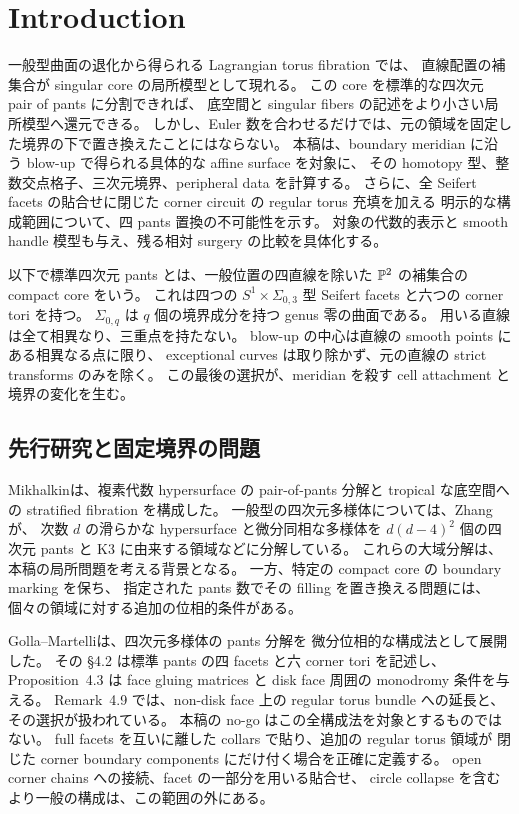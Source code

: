 \section{Introduction}
\label{cs8:introduction}

一般型曲面の退化から得られる Lagrangian torus fibration では、
直線配置の補集合が singular core の局所模型として現れる。
この core を標準的な四次元 pair of pants に分割できれば、
底空間と singular fibers の記述をより小さい局所模型へ還元できる。
しかし、Euler 数を合わせるだけでは、元の領域を固定した境界の下で置き換えたことにはならない。
本稿は、boundary meridian に沿う blow-up で得られる具体的な affine surface を対象に、
その homotopy 型、整数交点格子、三次元境界、peripheral data を計算する。
さらに、全 Seifert facets の貼合せに閉じた corner circuit の regular torus 充填を加える
明示的な構成範囲について、四 pants 置換の不可能性を示す。
対象の代数的表示と smooth handle 模型も与え、残る相対 surgery の比較を具体化する。

以下で標準四次元 pants とは、一般位置の四直線を除いた
$\mathbb P^2$ の補集合の compact core をいう。
これは四つの $S^1\times\Sigma_{0,3}$ 型 Seifert facets と六つの corner tori を持つ。
$\Sigma_{0,q}$ は $q$ 個の境界成分を持つ genus 零の曲面である。
用いる直線は全て相異なり、三重点を持たない。
blow-up の中心は直線の smooth points にある相異なる点に限り、
exceptional curves は取り除かず、元の直線の strict transforms のみを除く。
この最後の選択が、meridian を殺す cell attachment と境界の変化を生む。

\subsection{先行研究と固定境界の問題}

Mikhalkin\cite[Theorems~1 and~$1'$]{Mikhalkin}は、複素代数 hypersurface の
pair-of-pants 分解と tropical な底空間への stratified fibration を構成した。
一般型の四次元多様体については、Zhang\cite[Theorem~1.1]{Zhang}が、
次数 $d$ の滑らかな hypersurface と微分同相な多様体を
$d(d-4)^2$ 個の四次元 pants と K3 に由来する領域などに分解している。
これらの大域分解は、本稿の局所問題を考える背景となる。
一方、特定の compact core の boundary marking を保ち、
指定された pants 数でその filling を置き換える問題には、
個々の領域に対する追加の位相的条件がある。

Golla--Martelli\cite{GollaMartelli}は、四次元多様体の pants 分解を
微分位相的な構成法として展開した。
その \S4.2 は標準 pants の四 facets と六 corner tori を記述し、
Proposition~4.3 は face gluing matrices と disk face 周囲の monodromy 条件を与える。
Remark~4.9 では、non-disk face 上の regular torus bundle への延長と、
その選択が扱われている。
本稿の no-go はこの全構成法を対象とするものではない。
full facets を互いに離した collars で貼り、追加の regular torus 領域が
閉じた corner boundary components にだけ付く場合を正確に定義する。
open corner chains への接続、facet の一部分を用いる貼合せ、
circle collapse を含むより一般の構成は、この範囲の外にある。

